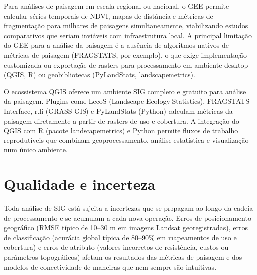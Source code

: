 \documentclass[
  portuguese,
  11pt,
  a4paper,
  open=any]{scrbook}
\begin{document}
Para análises de paisagem em escala regional ou nacional, o GEE permite
calcular séries temporais de NDVI, mapas de distância e métricas de
fragmentação para milhares de paisagens simultaneamente, viabilizando
estudos comparativos que seriam inviáveis com infraestrutura local. A
principal limitação do GEE para a análise da paisagem é a ausência de
algoritmos nativos de métricas de paisagem (FRAGSTATS, por exemplo), o
que exige implementação customizada ou exportação de rasters para
processamento em ambiente desktop (QGIS, R) ou geobibliotecas
(PyLandStats, landscapemetrics).

\begin{tcolorbox}[enhanced jigsaw, colbacktitle=quarto-callout-tip-color!10!white, coltitle=black, opacityback=0, breakable, left=2mm, colback=white, bottomtitle=1mm, toptitle=1mm, titlerule=0mm, arc=.35mm, opacitybacktitle=0.6, leftrule=.75mm, colframe=quarto-callout-tip-color-frame, title=\textcolor{quarto-callout-tip-color}{\faLightbulb}\hspace{0.5em}{SIG de código aberto para análise da paisagem}, rightrule=.15mm, bottomrule=.15mm, toprule=.15mm]

O ecossistema QGIS oferece um ambiente SIG completo e gratuito para
análise da paisagem. Plugins como LecoS (Landscape Ecology Statistics),
FRAGSTATS Interface, r.li (GRASS GIS) e PyLandStats (Python) calculam
métricas da paisagem diretamente a partir de rasters de uso e cobertura.
A integração do QGIS com R (pacote landscapemetrics) e Python permite
fluxos de trabalho reprodutíveis que combinam geoprocessamento, análise
estatística e visualização num único ambiente.

\end{tcolorbox}

\section{Qualidade e incerteza}\label{qualidade-e-incerteza}

Toda análise de SIG está sujeita a incertezas que se propagam ao longo
da cadeia de processamento e se acumulam a cada nova operação. Erros de
posicionamento geográfico (RMSE típico de 10--30 m em imagens Landsat
georegistradas), erros de classificação (acurácia global típica de
80--90\% em mapeamentos de uso e cobertura) e erros de atributo (valores
incorretos de resistência, custos ou parâmetros topográficos) afetam os
resultados das métricas de paisagem e dos modelos de conectividade de
maneiras que nem sempre são intuitivas.
\end{document}
